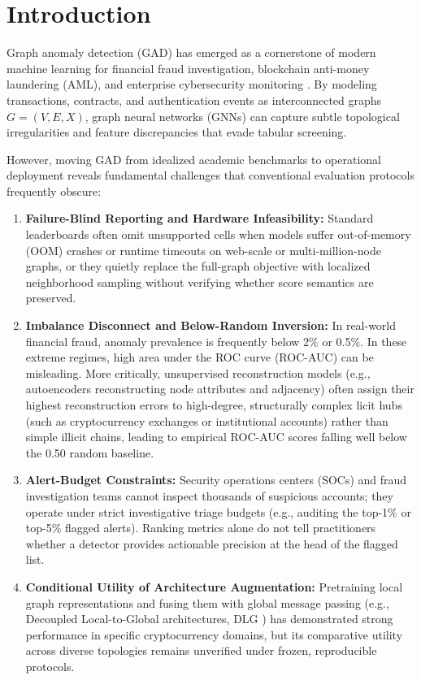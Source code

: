 \documentclass[applsci,article,submit,moreauthors,pdftex]{Definitions/mdpi}
\begin{document}
\setlength{\headheight}{21pt}

\section{Introduction}
\label{sec:introduction}
Graph anomaly detection (GAD) has emerged as a cornerstone of modern machine learning for financial fraud investigation, blockchain anti-money laundering (AML), and enterprise cybersecurity monitoring \cite{ma2023survey,qiao2025survey}. By modeling transactions, contracts, and authentication events as interconnected graphs $G=(V, E, X)$, graph neural networks (GNNs) can capture subtle topological irregularities and feature discrepancies that evade tabular screening.

However, moving GAD from idealized academic benchmarks to operational deployment reveals fundamental challenges that conventional evaluation protocols frequently obscure:
\begin{enumerate}
    \item \textbf{Failure-Blind Reporting and Hardware Infeasibility:} Standard leaderboards often omit unsupported cells when models suffer out-of-memory (OOM) crashes or runtime timeouts on web-scale or multi-million-node graphs, or they quietly replace the full-graph objective with localized neighborhood sampling without verifying whether score semantics are preserved.
    \item \textbf{Imbalance Disconnect and Below-Random Inversion:} In real-world financial fraud, anomaly prevalence is frequently below 2\% or 0.5\%. In these extreme regimes, high area under the ROC curve (ROC-AUC) can be misleading. More critically, unsupervised reconstruction models (e.g., autoencoders reconstructing node attributes and adjacency) often assign their highest reconstruction errors to high-degree, structurally complex licit hubs (such as cryptocurrency exchanges or institutional accounts) rather than simple illicit chains, leading to empirical ROC-AUC scores falling well below the 0.50 random baseline.
    \item \textbf{Alert-Budget Constraints:} Security operations centers (SOCs) and fraud investigation teams cannot inspect thousands of suspicious accounts; they operate under strict investigative triage budgets (e.g., auditing the top-1\% or top-5\% flagged alerts). Ranking metrics alone do not tell practitioners whether a detector provides actionable precision at the head of the flagged list.
    \item \textbf{Conditional Utility of Architecture Augmentation:} Pretraining local graph representations and fusing them with global message passing (e.g., Decoupled Local-to-Global architectures, DLG \cite{park2026dlg}) has demonstrated strong performance in specific cryptocurrency domains, but its comparative utility across diverse topologies remains unverified under frozen, reproducible protocols.
\end{enumerate}
\end{document}
